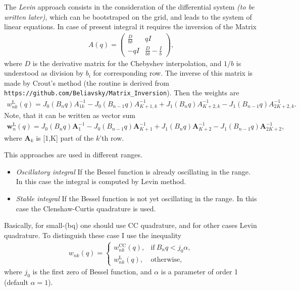 \documentclass[prd,nofootinbib,eqsecnum,final]{revtex4}
\renewcommand{\(}{\left(}
\renewcommand{\)}{\right)}
\renewcommand{\[}{\left[}
\renewcommand{\]}{\right]}
\renewcommand{\vec}[1]{\bm{#1}}
\begin{document}
The \textit{Levin} approach consists in the consideration of the differential system \textit{(to be written later)}, which can be bootstraped on the grid, and leads to the system of linear equations. In case of present integral it requires the inversion of the Matrix
\begin{eqnarray}
A(q)=
\(\begin{array}{cc}
\frac{D}{b \delta} & qI\\
-q I & \frac{D}{b \delta}-\frac{I}{b}  
\end{array}\),
\end{eqnarray}
where $D$ is the derivative matrix for the Chebyshev interpolation, and $1/b$ is understood as division by $b_i$ for corresponding row. The inverse of this matrix is made by Crout's method (the routine is derived from \texttt{https://github.com/Beliavsky/Matrix\_Inversion}). Then the weights are
\begin{eqnarray}
w^{\text{L}}_{nk}(q)=J_0(B_{n}q)A^{-1}_{1k}-J_0(B_{n-1}q)A^{-1}_{K+1,k}+J_1(B_{n}q)A^{-1}_{K+2,k}-J_1(B_{n-1}q)A^{-1}_{2K+2,k}.
\end{eqnarray}
Note, that it can be written as vector sum
\begin{eqnarray}
\vec w^{\text{L}}_{n}(q)=J_0(B_{n}q)\vec A^{-1}_{1}-J_0(B_{n-1}q)\vec A^{-1}_{K+1}+J_1(B_{n}q)\vec A^{-1}_{K+2}-J_1(B_{n-1}q)\vec A^{-1}_{2K+2},
\end{eqnarray}
where $\vec A_k$ is [1,K] part of the $k$'th row.

This approaches are used in different ranges.
\begin{itemize}
\item \textit{Oscillatory integral} If the Bessel function is already oscillating in the range. In this case the integral is computed by Levin method.
\item \textit{Stable integral} If the Bessel function is not yet oscillating in the range. In this case the Clenshaw-Curtis quadrature is used.
\end{itemize}
Basically, for small-(bq) one should use CC quadrature, and for other cases Levin quadrature. To distinguish these case I use the inequality
\begin{eqnarray}
w_{nk}(q)=
\left\{
\begin{array}{ll}
w^{\text{CC}}_{nk}(q),& \text{if}~B_nq < j_0 \alpha,
\\
w^{\text{L}}_{nk}(q),&\text{otherwise,}
\end{array}\right.%
\end{eqnarray}
where $j_0$ is the first zero of Bessel function, and $\alpha$ is a parameter of order 1 (default $\alpha=1$). 
\end{document}
